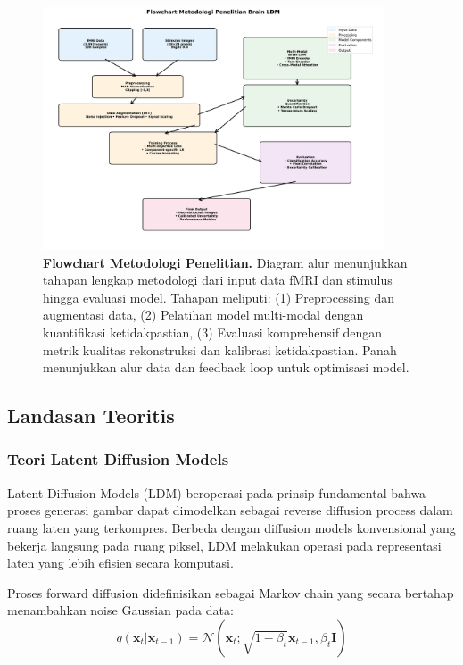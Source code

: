 \begin{figure}[htbp]
\centering
\includegraphics[width=0.9\textwidth]{../figures/Fig_methodology_flowchart.png}
\caption{\textbf{Flowchart Metodologi Penelitian.} Diagram alur menunjukkan tahapan lengkap metodologi dari input data fMRI dan stimulus hingga evaluasi model. Tahapan meliputi: (1) Preprocessing dan augmentasi data, (2) Pelatihan model multi-modal dengan kuantifikasi ketidakpastian, (3) Evaluasi komprehensif dengan metrik kualitas rekonstruksi dan kalibrasi ketidakpastian. Panah menunjukkan alur data dan feedback loop untuk optimisasi model.}
\label{fig:methodology_flowchart}
\end{figure}

\subsection{Landasan Teoritis}

\subsubsection{Teori Latent Diffusion Models}
Latent Diffusion Models (LDM) beroperasi pada prinsip fundamental bahwa proses generasi gambar dapat dimodelkan sebagai reverse diffusion process dalam ruang laten yang terkompres. Berbeda dengan diffusion models konvensional yang bekerja langsung pada ruang piksel, LDM melakukan operasi pada representasi laten yang lebih efisien secara komputasi.

Proses forward diffusion didefinisikan sebagai Markov chain yang secara bertahap menambahkan noise Gaussian pada data:
\begin{equation}
q(\mathbf{x}_t | \mathbf{x}_{t-1}) = \mathcal{N}(\mathbf{x}_t; \sqrt{1-\beta_t}\mathbf{x}_{t-1}, \beta_t \mathbf{I})
\label{eq:forward_diffusion}
\end{equation}

